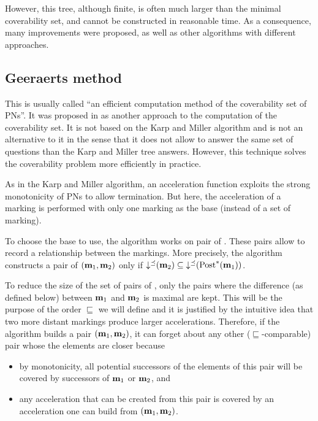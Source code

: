 However, this tree, although finite, is often much larger than the minimal coverability set, and cannot be constructed in reasonable time.
As a consequence, many improvements were proposed, as well as other algorithms with different approaches.

\subsection{Geeraerts method}
\label{sec:eff}

This is usually called ``an efficient computation method of the coverability set of \acp{PN}''.
It was proposed in \cite{Geeraerts07thesis, Geeraerts07} as another approach to the computation of the coverability set.
It is not based on the Karp and Miller algorithm and is not an alternative to it in the sense that it does not allow to answer the same set of questions than the Karp and Miller tree answers.
However, this technique solves the coverability problem more efficiently in practice.

As in the Karp and Miller algorithm, an acceleration function exploits the strong monotonicity of \acp{PN} to allow termination.
But here, the acceleration of a marking is performed with only one marking as the base (instead of a set of marking).

To choose the base to use, the algorithm works on pair of \omarks.
These pairs allow to record a relationship between the markings.
More precisely, the algorithm constructs a pair of \omarks $(\mathbf{m}_1, \mathbf{m}_2)$ only if $\operatorname{\downarrow^\preceq}(\mathbf{m}_2) \subseteq \operatorname{\downarrow^\preceq}(\operatorname{Post}^*_{}(\mathbf{m}_1))$.

To reduce the size of the set of pairs of \omarks, only the pairs where the difference (as defined below) between $\mathbf{m}_1$ and $\mathbf{m}_2$ is maximal are kept.
This will be the purpose of the order $\sqsubseteq$ we will define and it is justified by the intuitive idea that two more distant markings produce larger accelerations.
Therefore, if the algorithm builds a pair $(\mathbf{m}_1, \mathbf{m}_2)$, it can forget about any other ($\sqsubseteq$-comparable) pair whose the elements are closer because
\begin{itemize}
  \item by monotonicity, all potential successors of the elements of this pair will be covered by successors of $\mathbf{m}_1$ or $\mathbf{m}_2$, and
  \item any acceleration that can be created from this pair is covered by an acceleration one can build from $(\mathbf{m}_1, \mathbf{m}_2)$.
\end{itemize}

